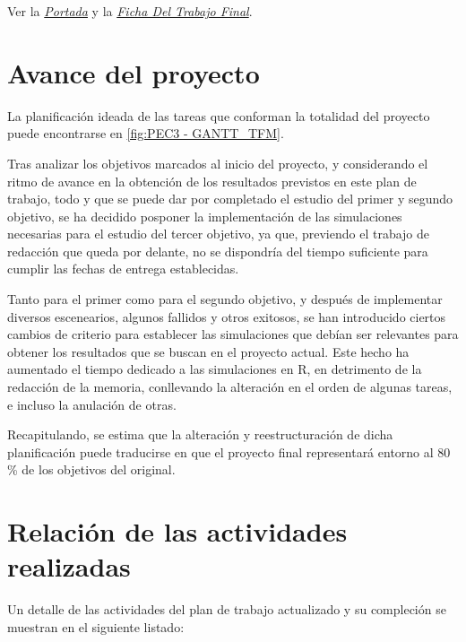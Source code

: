 \documentclass[IB,BIB]{TFUOC}%
\newcommand{\checkbox}{\text{\fboxsep=-.15pt\fbox{\rule{0pt}{1.5ex}\rule{1.5ex}{0pt}}}} %
\newcommand{\cmark}{\ding{51}} %
\newcommand{\xmark}{\ding{55}} %
\newcommand{\done}{\rlap{\checkbox}{\raisebox{1.2pt}{\large\hspace{1pt}\cmark}}
\hspace{-2.5pt}}
\newcommand{\wontfix}{\rlap{\checkbox}{\raisebox{-1.5pt}{\large\hspace{-.75pt}\xmark}}
\hspace{-2.5pt}}
\begin{document}
Ver la \textit{\hyperlink{portada}{Portada}} y la \textit{\hyperlink{ficha}{Ficha Del Trabajo Final}}. %


\section{Avance del proyecto}
\label{sec:Avance del proyecto}

La planificación ideada de las tareas que conforman la totalidad del proyecto puede encontrarse en \ref{fig:PEC3 - GANTT_TFM}.

Tras analizar los objetivos marcados al inicio del proyecto, y considerando el ritmo de avance en la obtención de los resultados previstos en este plan de trabajo, todo y que se puede dar por completado el estudio del primer y segundo objetivo, se ha decidido posponer la implementación de las simulaciones necesarias para el estudio del tercer objetivo, ya que, previendo el trabajo de redacción que queda por delante, no se dispondría del tiempo suficiente para cumplir las fechas de entrega establecidas. 

Tanto para el primer como para el segundo objetivo, y después de implementar diversos escenearios, algunos fallidos y otros exitosos, se han introducido ciertos cambios de criterio para establecer las simulaciones que debían ser relevantes para obtener los resultados que se buscan en el proyecto actual. Este hecho ha aumentado el tiempo dedicado a las simulaciones en R, en detrimento de la redacción de la memoria, conllevando la alteración en el orden de algunas tareas, e incluso la anulación de otras.

Recapitulando, se estima que la alteración y reestructuración de dicha planificación puede traducirse en que el proyecto final representará entorno al 80 \% de los objetivos del original.


\section{Relación de las actividades realizadas}
\label{sec:Relación de las actividades realizadas}

Un detalle de las actividades del plan de trabajo actualizado y su compleción se muestran en el siguiente listado:

\newpage

\end{document}
